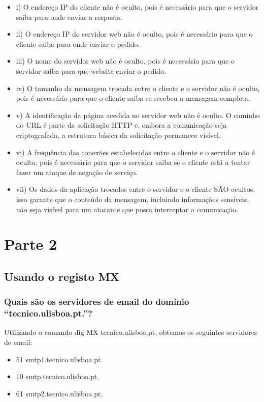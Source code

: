 \documentclass{article}
\begin{document}
\begin{itemize}
    \item i) O endereço IP do cliente não é oculto, pois é necessário para que o servidor saiba para onde enviar a resposta.
    \item ii) O endereço IP do servidor web não é oculto, pois é necessário para que o cliente saiba para onde enviar o pedido.
    \item iii) O nome do servidor web não é oculto, pois é necessário para que o servidor saiba para que website enviar o pedido.
    \item iv) O tamanho da mensagem trocada entre o cliente e o servidor não é oculto, pois é necessário para que o cliente saiba se recebeu a mensagem completa.
    \item v) A identificação da página acedida no servidor web não é oculto. O caminho do URL é parte da solicitação HTTP e, embora a comunicação seja criptografada, a estrutura básica da solicitação permanece visível.
    \item vi) A frequência das conexões estabelecidas entre o cliente e o servidor não é oculto, pois é necessário para que o servidor saiba se o cliente está a tentar fazer um ataque de negação de serviço.
    \item vii) Os dados da aplicação trocados entre o servidor e o cliente SÃO ocultos, isso garante que o conteúdo da mensagem, incluindo informações sensíveis, não seja visível para um atacante que possa interceptar a comunicação. 
\end{itemize}

\section{Parte 2}


\subsection{Usando o registo MX}
\subsubsection{Quais são os servidores de email do domínio “tecnico.ulisboa.pt.”?}

Utilizando o comando dig MX tecnico.ulisboa.pt, obtemos os seguintes servidores de email:
\begin{itemize}
    \item 51 smtp1.tecnico.ulisboa.pt.
    \item 10 smtp.tecnico.ulisboa.pt.
    \item 61 smtp2.tecnico.ulisboa.pt.
\end{itemize}
\end{document}
